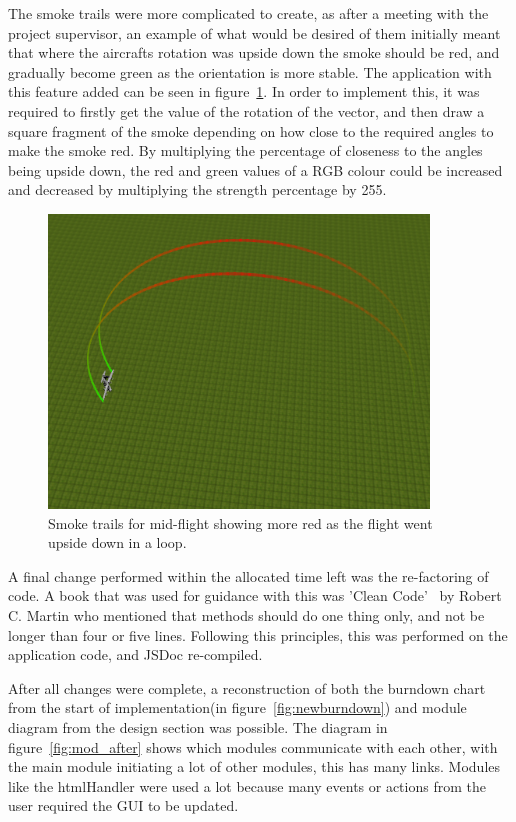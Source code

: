 The smoke trails were more complicated to create, as after a meeting with the project supervisor, an example of what would be desired of them initially meant that where the aircrafts rotation was upside down the smoke should be red, and gradually become green as the orientation is more stable. The application with this feature added can be seen in figure~\ref{fig:smoke}. In order to implement this, it was required to firstly get the value of the rotation of the vector, and then draw a square fragment of the smoke depending on how close to the required angles to make the smoke red. By multiplying the percentage of closeness to the angles being upside down, the red and green values of a RGB colour could be increased and decreased by multiplying the strength percentage by 255.

\begin{figure}[h!]
	\centering
	\includegraphics[width=0.9\textwidth]{images/smoke.png}
	\caption{Smoke trails for mid-flight showing more red as the flight went upside down in a loop.}
	\label{fig:smoke}
\end{figure}

A final change performed within the allocated time left was the re-factoring of code. A book that was used for guidance with this was 'Clean Code'~\cite{clean_code} by Robert C. Martin who mentioned that methods should do one thing only, and not be longer than four or five lines. Following this principles, this was performed on the application code, and JSDoc re-compiled.

After all changes were complete, a reconstruction of both the burndown chart from the start of implementation(in figure~\ref{fig:newburndown}) and module diagram from the design section was possible. The diagram in figure~\ref{fig:mod_after} shows which modules communicate with each other, with the main module initiating a lot of other modules, this has many links. Modules like the htmlHandler were used a lot because many events or actions from the user required the GUI to be updated.

